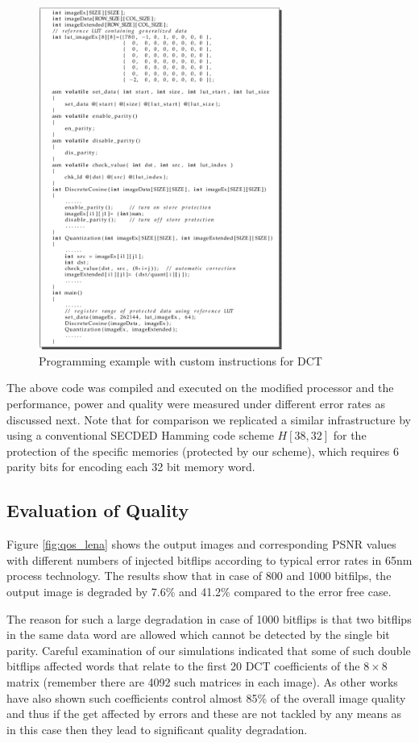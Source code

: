 \begin{figure}
\centering
\includegraphics[width=80mm]{./eps/qos_program}
\caption{Programming example with custom instructions for DCT}
\vspace{-4mm}
\label{fig:qos_program}
\end{figure}

The above code was compiled and executed on the modified processor and the performance, power and quality were measured under different error rates as discussed next. Note that for comparison we replicated a similar infrastructure by using a conventional SECDED Hamming code scheme $H[38, 32]$ for the protection of the specific memories (protected by our scheme), which requires 6 parity bits for encoding each 32 bit memory word.  

\subsection{Evaluation of Quality}

Figure \ref{fig:qos_lena} shows the output images and corresponding PSNR values with different numbers of injected bitflips according to typical error rates in 65nm process technology. The results show that in case of 800 and 1000 bitfilps, the output image is degraded by 7.6\% and 41.2\% compared to the error free case.
 
The reason for such a large degradation in case of 1000 bitflips is that two bitflips in the same data word are allowed
which cannot be detected by the single bit parity. Careful examination of our simulations indicated that some of such double bitflips affected words that relate to the first 20 DCT coefficients of the $8 \times 8$ matrix (remember there are 4092 such matrices in each image). As other works have also shown such coefficients control almost 85\% of the overall image quality and thus if the get affected by errors and these are not tackled by any means as in this case then they lead to significant quality degradation. 

